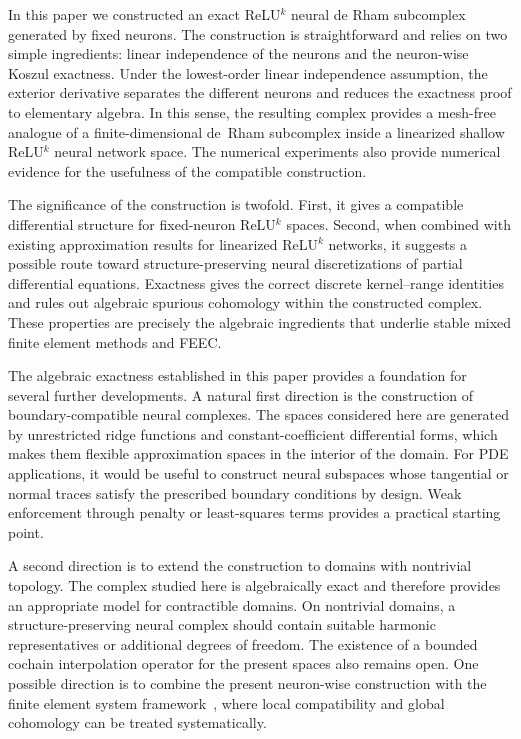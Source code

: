 \documentclass[pdflatex,sn-mathphys-num]{sn-jnl}
\numberwithin{equation}{section}
\numberwithin{theorem}{section}
\numberwithin{table}{section}
\numberwithin{figure}{section}
\begin{document}
In this paper we constructed an exact ReLU$^k$ neural de Rham subcomplex generated by fixed neurons.  The construction is straightforward and relies on two simple ingredients: linear independence of the neurons and the neuron-wise Koszul exactness.  Under the lowest-order linear independence assumption, the exterior derivative separates the different neurons and reduces the exactness proof to elementary algebra. In this sense, the resulting complex provides a mesh-free analogue of a finite-dimensional de~Rham subcomplex inside a linearized shallow ReLU$^k$ neural network space. The numerical experiments also provide numerical evidence for the usefulness of the compatible construction.



The significance of the construction is twofold.  First, it gives a compatible differential structure for fixed-neuron ReLU$^k$ spaces. Second, when combined with existing approximation results for linearized ReLU$^k$ networks, it suggests a possible route toward structure-preserving neural discretizations of partial differential equations.  Exactness gives the correct discrete kernel--range identities and rules out algebraic spurious cohomology within the constructed complex.  These properties are precisely the algebraic ingredients that underlie stable mixed finite element methods and FEEC.  

The algebraic exactness established in this paper provides a foundation for several further developments. A natural first direction is the construction of boundary-compatible neural complexes. The spaces considered here are generated by unrestricted ridge functions and constant-coefficient differential forms, which makes them flexible approximation spaces in the interior of the domain. For PDE applications, it would be useful to construct neural subspaces whose tangential or normal traces satisfy the prescribed boundary conditions by design. Weak enforcement through penalty or least-squares terms provides a practical starting point. 

A second direction is to extend the construction to domains with nontrivial topology. The complex studied here is algebraically exact and therefore provides an appropriate model for contractible domains. On nontrivial domains, a structure-preserving neural complex should contain suitable harmonic representatives or additional degrees of freedom. The existence of a bounded cochain interpolation operator for the present spaces also remains open. One possible direction is to combine the present neuron-wise construction with the finite element system framework~\cite{christiansen2018generalized}, where local compatibility and global cohomology can be treated systematically. 
\end{document}
